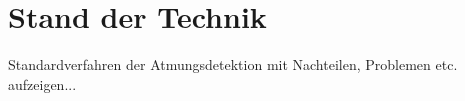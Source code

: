 
\chapter{Stand der Technik}\label{Stand der Technik}
Standardverfahren der Atmungsdetektion mit Nachteilen, Problemen etc. aufzeigen...